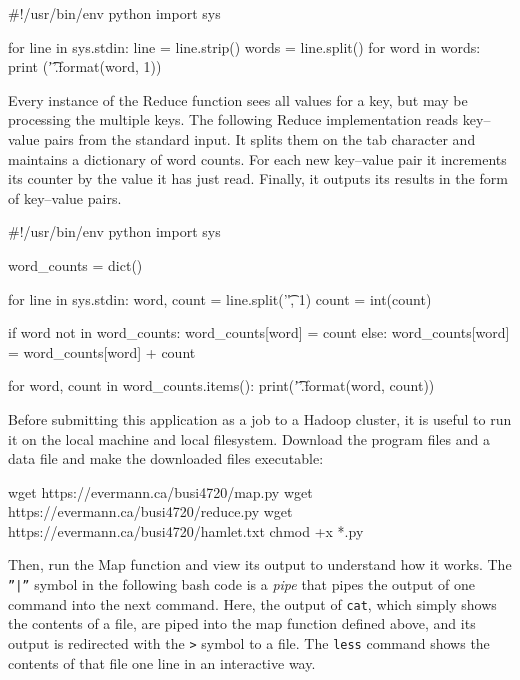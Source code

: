 \begin{samepage}
\begin{pythoncode}
#!/usr/bin/env python
import sys

for line in sys.stdin:
    line = line.strip()
    words = line.split()
    for word in words:
        print ('{}\t{}'.format(word, 1))
\end{pythoncode}
\end{samepage}

Every instance of the Reduce function sees all values for a key, but may be processing the multiple keys. The following Reduce implementation reads key--value pairs from the standard input. It splits them on the tab character and maintains a dictionary of word counts. For each new key--value pair it increments its counter by the value it has just read. Finally, it outputs its results in the form of key--value pairs.

\begin{samepage}
\begin{pythoncode}
#!/usr/bin/env python
import sys

word_counts = dict()

for line in sys.stdin:
    word, count = line.split('\t', 1)
    count = int(count)

    if word not in word_counts:
       word_counts[word] = count
    else:
      word_counts[word] = word_counts[word] + count

for word, count in word_counts.items():
    print('{}\t{}'.format(word, count))
\end{pythoncode}
\end{samepage}

Before submitting this application as a job to a Hadoop cluster, it is useful to run it on the local machine and local filesystem. Download the program files and a data file and make the downloaded files executable:

\begin{samepage}
\begin{bashcode}
wget https://evermann.ca/busi4720/map.py
wget https://evermann.ca/busi4720/reduce.py
wget https://evermann.ca/busi4720/hamlet.txt
chmod +x *.py
\end{bashcode}
\end{samepage}

Then, run the Map function and view its output to understand how it works. The \texttt{''|''} symbol in the following bash code is a \emph{pipe} that pipes the output of one command into the next command. Here, the output of \texttt{cat}, which simply shows the contents of a file, are piped into the map function defined above, and its output is redirected with the \texttt{>} symbol to a file. The \texttt{less} command shows the contents of that file one line in an interactive way.


